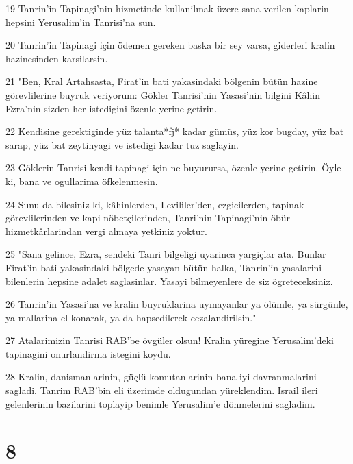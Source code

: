 \par 19 Tanrin'in Tapinagi'nin hizmetinde kullanilmak üzere sana verilen kaplarin hepsini Yerusalim'in Tanrisi'na sun.
\par 20 Tanrin'in Tapinagi için ödemen gereken baska bir sey varsa, giderleri kralin hazinesinden karsilarsin.
\par 21 "Ben, Kral Artahsasta, Firat'in bati yakasindaki bölgenin bütün hazine görevlilerine buyruk veriyorum: Gökler Tanrisi'nin Yasasi'nin bilgini Kâhin Ezra'nin sizden her istedigini özenle yerine getirin.
\par 22 Kendisine gerektiginde yüz talanta*fj* kadar gümüs, yüz kor bugday, yüz bat sarap, yüz bat zeytinyagi ve istedigi kadar tuz saglayin.
\par 23 Göklerin Tanrisi kendi tapinagi için ne buyurursa, özenle yerine getirin. Öyle ki, bana ve ogullarima öfkelenmesin.
\par 24 Sunu da bilesiniz ki, kâhinlerden, Levililer'den, ezgicilerden, tapinak görevlilerinden ve kapi nöbetçilerinden, Tanri'nin Tapinagi'nin öbür hizmetkârlarindan vergi almaya yetkiniz yoktur.
\par 25 "Sana gelince, Ezra, sendeki Tanri bilgeligi uyarinca yargiçlar ata. Bunlar Firat'in bati yakasindaki bölgede yasayan bütün halka, Tanrin'in yasalarini bilenlerin hepsine adalet saglasinlar. Yasayi bilmeyenlere de siz ögreteceksiniz.
\par 26 Tanrin'in Yasasi'na ve kralin buyruklarina uymayanlar ya ölümle, ya sürgünle, ya mallarina el konarak, ya da hapsedilerek cezalandirilsin."
\par 27 Atalarimizin Tanrisi RAB'be övgüler olsun! Kralin yüregine Yerusalim'deki tapinagini onurlandirma istegini koydu.
\par 28 Kralin, danismanlarinin, güçlü komutanlarinin bana iyi davranmalarini sagladi. Tanrim RAB'bin eli üzerimde oldugundan yüreklendim. Israil ileri gelenlerinin bazilarini toplayip benimle Yerusalim'e dönmelerini sagladim.

\chapter{8}

